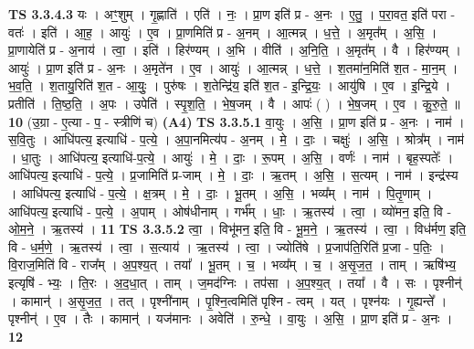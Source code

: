 \documentclass[17pt]{extarticle}
\begin{document}
                                \textbf{ TS 3.3.4.3} \newline
                  यः । अꣳ॒॒शुम् । गृ॒ह्णाति॑ । एति॑ । नः॒ । प्रा॒ण इति॑ प्र - अ॒नः । ए॒तु॒ । प॒रा॒वत॒ इति॑ परा - वतः॑ । इति॑ । आ॒ह॒ । आयुः॑ । ए॒व । प्रा॒णमिति॑ प्र - अ॒नम् । आ॒त्मन्न् । ध॒त्ते॒ । अ॒मृत᳚म् । अ॒सि॒ । प्रा॒णायेति॑ प्र - अ॒नाय॑ । त्वा॒ । इति॑ । हिर॑ण्यम् । अ॒भि । वीति॑ । अ॒नि॒ति॒ । अ॒मृत᳚म् । वै । हिर॑ण्यम् । आयुः॑ । प्रा॒ण इति॑ प्र - अ॒नः । अ॒मृते॑न । ए॒व । आयुः॑ । आ॒त्मन्न् । ध॒त्ते॒ । श॒तमा॑न॒मिति॑ श॒त - मा॒न॒म् । भ॒व॒ति॒ । श॒तायु॒रिति॑ श॒त - आ॒युः॒ । पुरु॑षः । श॒तेन्द्रि॑य॒ इति॑ श॒त - इ॒न्द्रि॒यः॒ । आयु॑षि । ए॒व । इ॒न्द्रि॒ये । प्रतीति॑ । ति॒ष्ठ॒ति॒ । अ॒पः । उपेति॑ । स्पृ॒श॒ति॒ । भे॒ष॒जम् । वै । आपः॑ ( ) । भे॒ष॒जम् । ए॒व । कु॒रु॒ते॒ ॥ \textbf{  10 } \newline
                  \newline
                      (उ॒ग्रा - ए॒त्या - प॒ - स्त्रीणि॑ च)  \textbf{(A4)} \newline \newline
                                \textbf{ TS 3.3.5.1} \newline
                  वा॒युः । अ॒सि॒ । प्रा॒ण इति॑ प्र - अ॒नः । नाम॑ । स॒वि॒तुः । आधि॑पत्य॒ इत्याधि॑ - प॒त्ये॒ । अ॒पा॒नमित्य॑प - अ॒नम् । मे॒ । दाः॒ । चक्षुः॑ । अ॒सि॒ । श्रोत्र᳚म् । नाम॑ । धा॒तुः । आधि॑पत्य॒ इत्याधि॑-प॒त्ये॒ । आयुः॑ । मे॒ । दाः॒ । रू॒पम् । अ॒सि॒ । वर्णः॑ । नाम॑ । बृह॒स्पतेः᳚ । आधि॑पत्य॒ इत्याधि॑ - प॒त्ये॒ । प्र॒जामिति॑ प्र-जाम् । मे॒ । दाः॒ । ऋ॒तम् । अ॒सि॒ । स॒त्यम् । नाम॑ । इन्द्र॑स्य । आधि॑पत्य॒ इत्याधि॑ - प॒त्ये॒ । क्ष॒त्रम् । मे॒ । दाः॒ । भू॒तम् । अ॒सि॒ । भव्य᳚म् । नाम॑ । पि॒तृ॒णाम् । आधि॑पत्य॒ इत्याधि॑ - प॒त्ये॒ । अ॒पाम् । ओष॑धीनाम् । गर्भ᳚म् । धाः॒ । ऋ॒तस्य॑ । त्वा॒ । व्यो॑मन॒ इति॒ वि - ओ॒म॒ने॒ । ऋ॒तस्य॑ । \textbf{  11} \newline
                  \newline
                                \textbf{ TS 3.3.5.2} \newline
                  त्वा॒ । विभू॑मन॒ इति॒ वि - भू॒म॒ने॒ । ऋ॒तस्य॑ । त्वा॒ । विध॑र्मण॒ इति॒ वि - ध॒र्म॒णे॒ । ऋ॒तस्य॑ । त्वा॒ । स॒त्याय॑ । ऋ॒तस्य॑ । त्वा॒ । ज्योति॑षे । प्र॒जाप॑ति॒रिति॑ प्र॒जा - प॒तिः॒ । वि॒राज॒मिति॑ वि - राज᳚म् । अ॒प॒श्य॒त् । तया᳚ । भू॒तम् । च॒ । भव्य᳚म् । च॒ । अ॒सृ॒ज॒त॒ । ताम् । ऋषि॑भ्य॒ इत्यृषि॑ - भ्यः॒ । ति॒रः । अ॒द॒धा॒त् । ताम् । ज॒मद॑ग्निः । तप॑सा । अ॒प॒श्य॒त् । तया᳚ । वै । सः । पृश्नीन्॑ । कामान्॑ । अ॒सृ॒ज॒त॒ । तत् । पृश्नी॑नाम् । पृ॒श्नि॒त्वमिति॑ पृश्नि - त्वम् । यत् । पृश्न॑यः । गृ॒ह्यन्ते᳚ । पृश्नीन्॑ । ए॒व । तैः । कामान्॑ । यज॑मानः । अवेति॑ । रु॒न्धे॒ । वा॒युः । अ॒सि॒ । प्रा॒ण इति॑ प्र - अ॒नः । \textbf{  12} \newline
\end{document}
